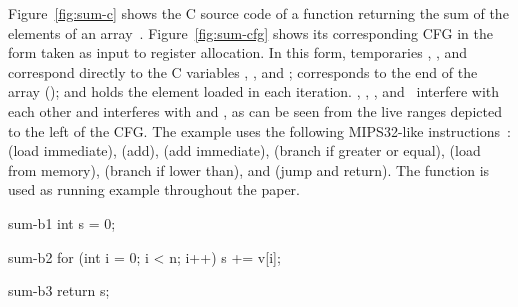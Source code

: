 \documentclass[acmsmall,authorversion,nonacm]{acmart}
\begin{document}
Figure~\ref{fig:sum-c} shows the C source code of a function returning
the sum of the  elements of an array~.
Figure~\ref{fig:sum-cfg} shows its corresponding CFG in the form taken
as input to register allocation.
In this form, temporaries , , and 
correspond directly to the C variables , , and
;  corresponds to the end of the array (); and  holds the element loaded in each iteration.
, , , and~ interfere with each
other and  interferes with  and , as
can be seen from the live ranges depicted to the left of the CFG.
The example uses the following MIPS32-like
instructions~\cite{Sweetman2006}:  (load immediate),
 (add),  (add immediate),  (branch if
greater or equal),  (load from memory),  (branch
if lower than), and  (jump and return).
The  function is used as running example throughout the paper.

\begin{SaveVerbatim}{sum-in}
int sum(char * v, int n) {
\end{SaveVerbatim}
\begin{SaveVerbatim}{sum-b1}
int s = 0;
\end{SaveVerbatim}
\begin{SaveVerbatim}{sum-b2}
for (int i = 0; i < n; i++) {
  s += v[i];
}
\end{SaveVerbatim}
\begin{SaveVerbatim}{sum-b3}
return s;
\end{SaveVerbatim}
\begin{SaveVerbatim}{sum-out}
}
\end{SaveVerbatim}
\end{document}
